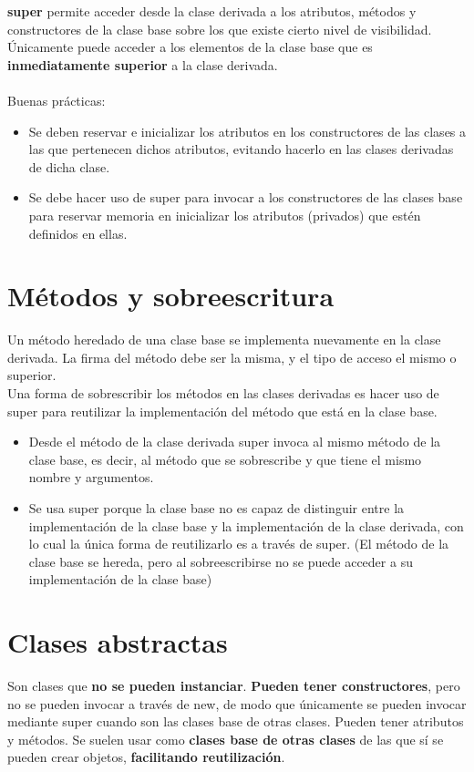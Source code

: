 \documentclass{article}
\begin{document}
\textbf{super} permite acceder desde la clase derivada a los atributos, métodos y constructores de la clase base sobre los que existe cierto nivel de visibilidad. Únicamente puede acceder a los elementos de la clase base que es \textbf{inmediatamente superior} a la clase derivada. \\

\\

Buenas prácticas:
\begin{itemize}
    \item Se deben reservar e inicializar los atributos en los constructores de las clases a las que pertenecen dichos atributos, evitando hacerlo en las clases derivadas de dicha clase.
    
    \item Se debe hacer uso de super para invocar a los constructores de las clases base para reservar memoria en inicializar los atributos (privados) que estén definidos en ellas.
\end{itemize}

\section{Métodos y sobreescritura}
Un método heredado de una clase base se implementa nuevamente en la clase derivada. La firma del método debe ser la misma, y el tipo de acceso el mismo o superior. \\

Una forma de sobrescribir los métodos en las clases derivadas es hacer uso de super para reutilizar la implementación del método que está en la clase base.
\begin{itemize}
    \item Desde el método de la clase derivada super invoca al mismo método de la clase base, es decir, al método que se sobrescribe y que tiene el mismo nombre y argumentos.
    
    \item Se usa super porque la clase base no es capaz de distinguir entre la implementación de la clase base y la implementación de la clase derivada, con lo cual la única forma de reutilizarlo es a través de super. (El método de la clase base se hereda, pero al sobreescribirse no se puede acceder a su implementación de la clase base)
\end{itemize}

\newpage

\section{Clases abstractas}
Son clases que \textbf{no se pueden instanciar}. \textbf{Pueden tener constructores}, pero no se pueden invocar a través de new, de modo que únicamente se pueden invocar mediante super cuando son las clases base de otras clases. Pueden tener atributos y métodos. Se suelen usar como \textbf{clases base de otras clases} de las que sí se pueden crear objetos, \textbf{facilitando reutilización}. \\
\end{document}
